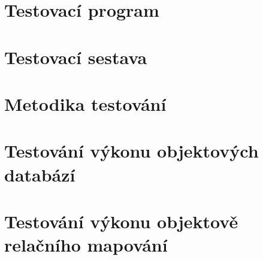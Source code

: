 \section{Testovací program}


\section{Testovací sestava}


\section{Metodika testování}


\section{Testování výkonu objektových databází}


\section{Testování výkonu objektově relačního mapování }

